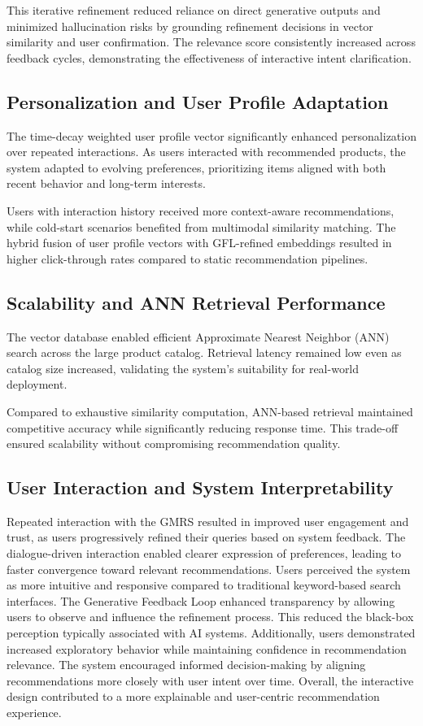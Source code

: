 \documentclass[conference]{IEEEtran}
\begin{document}
This iterative refinement reduced reliance on direct generative outputs and minimized hallucination risks by grounding refinement decisions in vector similarity and user confirmation. The relevance score consistently increased across feedback cycles, demonstrating the effectiveness of interactive intent clarification.

\subsection{Personalization and User Profile Adaptation}

The time-decay weighted user profile vector significantly enhanced personalization over repeated interactions. As users interacted with recommended products, the system adapted to evolving preferences, prioritizing items aligned with both recent behavior and long-term interests.

Users with interaction history received more context-aware recommendations, while cold-start scenarios benefited from multimodal similarity matching. The hybrid fusion of user profile vectors with GFL-refined embeddings resulted in higher click-through rates compared to static recommendation pipelines.

\subsection{Scalability and ANN Retrieval Performance}

The vector database enabled efficient Approximate Nearest Neighbor (ANN) search across the large product catalog. Retrieval latency remained low even as catalog size increased, validating the system’s suitability for real-world deployment.

Compared to exhaustive similarity computation, ANN-based retrieval maintained competitive accuracy while significantly reducing response time. This trade-off ensured scalability without compromising recommendation quality.

\subsection{User Interaction and System Interpretability}

Repeated interaction with the GMRS resulted in improved user engagement and trust, as users progressively refined their queries based on system feedback. The dialogue-driven interaction enabled clearer expression of preferences, leading to faster convergence toward relevant recommendations. Users perceived the system as more intuitive and responsive compared to traditional keyword-based search interfaces. The Generative Feedback Loop enhanced transparency by allowing users to observe and influence the refinement process. This reduced the black-box perception typically associated with AI systems. Additionally, users demonstrated increased exploratory behavior while maintaining confidence in recommendation relevance. The system encouraged informed decision-making by aligning recommendations more closely with user intent over time. Overall, the interactive design contributed to a more explainable and user-centric recommendation experience.
\end{document}
